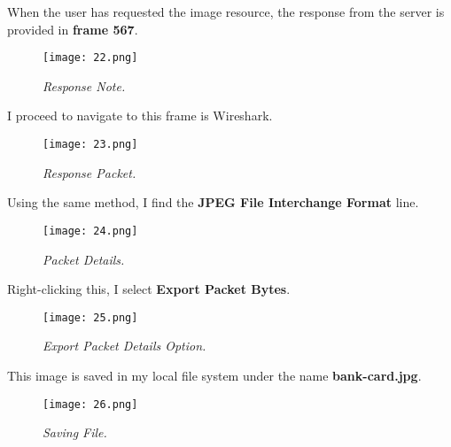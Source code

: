 When the user has requested the image resource, the response from the server is provided in \textbf{frame 567}.

\begin{figure}[H]
    \setlength{\abovecaptionskip}{20pt}
    \setlength{\belowcaptionskip}{0pt}
    \centering
    \texttt{[image: 22.png]}
    \captionsetup{justification=centering}
    \caption{\textit{Response Note.}}
    \label{fig:22}
\end{figure}
\vspace{-10pt}

I proceed to navigate to this frame is Wireshark.

\begin{figure}[H]
    \setlength{\abovecaptionskip}{20pt}
    \setlength{\belowcaptionskip}{0pt}
    \centering
    \texttt{[image: 23.png]}
    \captionsetup{justification=centering}
    \caption{\textit{Response Packet.}}
    \label{fig:23}
\end{figure}
\vspace{-10pt}

Using the same method, I find the \textbf{JPEG File Interchange Format} line.

\begin{figure}[H]
    \setlength{\abovecaptionskip}{20pt}
    \setlength{\belowcaptionskip}{0pt}
    \centering
    \texttt{[image: 24.png]}
    \captionsetup{justification=centering}
    \caption{\textit{Packet Details.}}
    \label{fig:24}
\end{figure}
\vspace{-10pt}

Right-clicking this, I select \textbf{Export Packet Bytes}.

\begin{figure}[H]
    \setlength{\abovecaptionskip}{20pt}
    \setlength{\belowcaptionskip}{0pt}
    \centering
    \texttt{[image: 25.png]}
    \captionsetup{justification=centering}
    \caption{\textit{Export Packet Details Option.}}
    \label{fig:25}
\end{figure}
\vspace{-10pt}

This image is saved in my local file system under the name \textbf{bank-card.jpg}.

\begin{figure}[H]
    \setlength{\abovecaptionskip}{20pt}
    \setlength{\belowcaptionskip}{0pt}
    \centering
    \texttt{[image: 26.png]}
    \captionsetup{justification=centering}
    \caption{\textit{Saving File.}}
    \label{fig:26}
\end{figure}
\vspace{-10pt}

